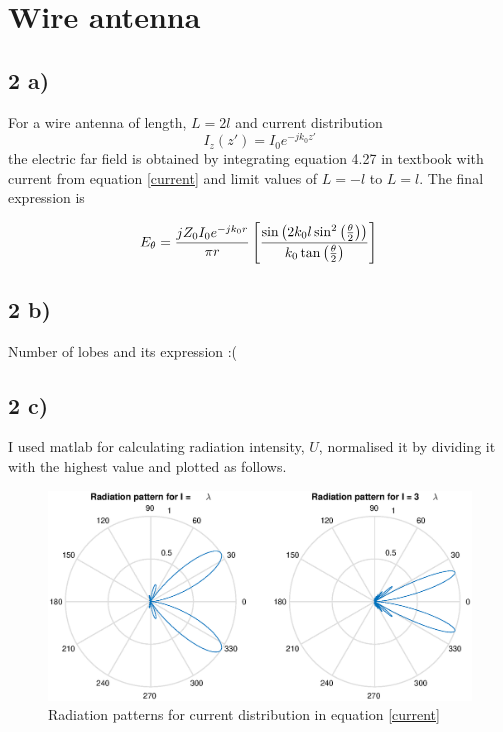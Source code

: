 \documentclass[11pt, oneside]{article}   	%
\begin{document}
\section{Wire antenna}
\subsection*{2 a)} 
For a wire antenna of length, $ L=2l$  and current distribution 
\begin{equation} \label{current}
I_z(z') = I_0e^{-jk_0z'}
\end{equation}
the electric far field is obtained by integrating equation 4.27 in textbook with current from equation \ref{current} and limit values of $L = -l $ to $L = l $. The final expression is

\begin{equation} 
E_{\theta} = \frac{jZ_0I_0e^{-jk_0r}}{\pi r} \left[\frac{\sin\left(2k_0l\sin ^{2}\left(\frac{\theta}{2}\right)\right)}{k_0\tan\left(\frac{\theta}{2}\right)}\right] \\
\end{equation}

\subsection*{2 b)}
Number of lobes and its expression :(
 
\subsection*{2 c)} 
I used matlab for calculating radiation intensity, $U$, normalised it by dividing it with the highest value and plotted as follows.
\begin{figure} [H]
  \centering 
  \includegraphics[width=\textwidth]{radiation.eps} 
  \caption{Radiation patterns for current distribution in equation \ref{current}}
  \label{result} 
\end{figure}
\end{document}
